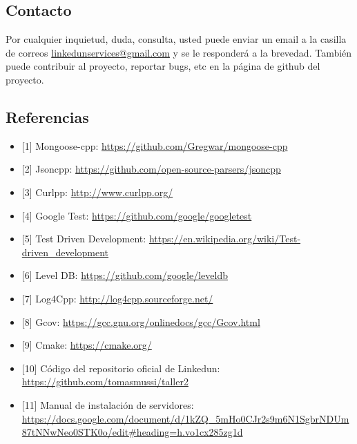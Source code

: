 \documentclass[a4paper,10pt,spanish]{sphinxmanual}
\begin{document}
\subsection{Contacto}
\label{docTecnica:contacto}
Por cualquier inquietud, duda, consulta, usted puede enviar un email a la casilla de correos \href{mailto:linkedunservices@gmail.com}{linkedunservices@gmail.com} y se le responderá a la brevedad.
También puede contribuir al proyecto, reportar bugs, etc en la página de github del proyecto.


\subsection{Referencias}
\label{docTecnica:referencias}\begin{itemize}
\item {} 
{[}1{]} Mongoose-cpp: \url{https://github.com/Gregwar/mongoose-cpp}

\item {} 
{[}2{]} Jsoncpp: \url{https://github.com/open-source-parsers/jsoncpp}

\item {} 
{[}3{]} Curlpp: \url{http://www.curlpp.org/}

\item {} 
{[}4{]} Google Test: \url{https://github.com/google/googletest}

\item {} 
{[}5{]} Test Driven Development: \url{https://en.wikipedia.org/wiki/Test-driven\_development}

\item {} 
{[}6{]} Level DB: \url{https://github.com/google/leveldb}

\item {} 
{[}7{]} Log4Cpp: \url{http://log4cpp.sourceforge.net/}

\item {} 
{[}8{]} Gcov: \url{https://gcc.gnu.org/onlinedocs/gcc/Gcov.html}

\item {} 
{[}9{]} Cmake: \url{https://cmake.org/}

\item {} 
{[}10{]} Código del repositorio oficial de Linkedun: \url{https://github.com/tomasmussi/taller2}

\item {} 
{[}11{]} Manual de instalación de servidores: \url{https://docs.google.com/document/d/1kZQ\_5mHo0CJr2s9m6N1SgbrNDUm87tNNwNeo0STK0o/edit\#heading=h.vo1cx285zg1d}

\end{itemize}
\end{document}
